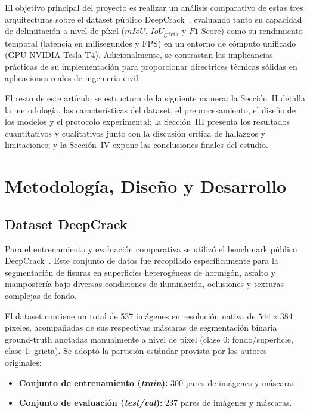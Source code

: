 \documentclass[conference]{IEEEtran}
\begin{document}
El objetivo principal del proyecto es realizar un análisis comparativo de estas tres arquitecturas sobre el dataset público DeepCrack~\cite{liu2019deepcrack}, evaluando tanto su capacidad de delimitación a nivel de píxel ($mIoU$, $IoU_{\text{grieta}}$ y $F1\text{-Score}$) como su rendimiento temporal (latencia en milisegundos y FPS) en un entorno de cómputo unificado (GPU NVIDIA Tesla T4). Adicionalmente, se contrastan las implicancias prácticas de su implementación para proporcionar directrices técnicas sólidas en aplicaciones reales de ingeniería civil.

El resto de este artículo se estructura de la siguiente manera: la Sección~II detalla la metodología, las características del dataset, el preprocesamiento, el diseño de los modelos y el protocolo experimental; la Sección~III presenta los resultados cuantitativos y cualitativos junto con la discusión crítica de hallazgos y limitaciones; y la Sección~IV expone las conclusiones finales del estudio.

\section{Metodología, Diseño y Desarrollo}

\subsection{Dataset DeepCrack}
Para el entrenamiento y evaluación comparativa se utilizó el benchmark público DeepCrack~\cite{liu2019deepcrack}. Este conjunto de datos fue recopilado específicamente para la segmentación de fisuras en superficies heterogéneas de hormigón, asfalto y mampostería bajo diversas condiciones de iluminación, oclusiones y texturas complejas de fondo.

El dataset contiene un total de 537 imágenes en resolución nativa de $544 \times 384$ píxeles, acompañadas de sus respectivas máscaras de segmentación binaria ground-truth anotadas manualmente a nivel de píxel (clase 0: fondo/superficie, clase 1: grieta). Se adoptó la partición estándar provista por los autores originales:
\begin{itemize}
    \item \textbf{Conjunto de entrenamiento (\textit{train}):} 300 pares de imágenes y máscaras.
    \item \textbf{Conjunto de evaluación (\textit{test/val}):} 237 pares de imágenes y máscaras.
\end{itemize}
\end{document}
